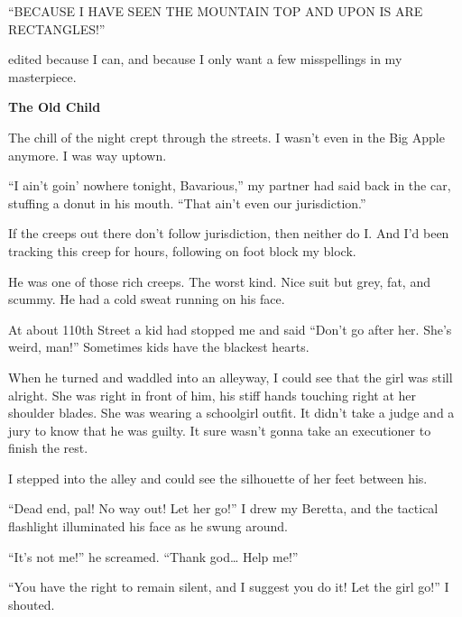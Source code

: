 ``BECAUSE I HAVE SEEN THE MOUNTAIN TOP AND UPON IS ARE
RECTANGLES!''



edited because I can, and because I only want a few misspellings in
my masterpiece. 
 





{\bf The Old Child}



The chill of the night crept through the streets. I wasn't
even in the Big Apple anymore. I was way uptown.



``I ain't goin' nowhere tonight, Bavarious,''
my partner had said back in the car, stuffing a donut in his mouth.
``That ain't even our jurisdiction.''



If the creeps out there don't follow jurisdiction, then
neither do I. And I'd been tracking this creep for hours,
following on foot block my block.



He was one of those rich creeps. The worst kind. Nice suit but
grey, fat, and scummy. He had a cold sweat running on his
face.



At about 110th Street a kid had stopped me and said ``Don't go after
her. She's weird, man!'' Sometimes kids have the blackest
hearts.



When he turned and waddled into an alleyway, I could see that the
girl was still alright. She was right in front of him, his stiff
hands touching right at her shoulder blades. She was wearing a
schoolgirl outfit. It didn't take a judge and a jury to know
that he was guilty. It sure wasn't gonna take an executioner
to finish the rest.



I stepped into the alley and could see the silhouette of her feet
between his.



``Dead end, pal! No way out! Let her go!'' I drew my
Beretta, and the tactical flashlight illuminated his face as he
swung around.



``It's not me!'' he screamed. ``Thank god{\ldots}
Help me!''



``You have the right to remain silent, and I suggest you do
it! Let the girl go!'' I shouted.



